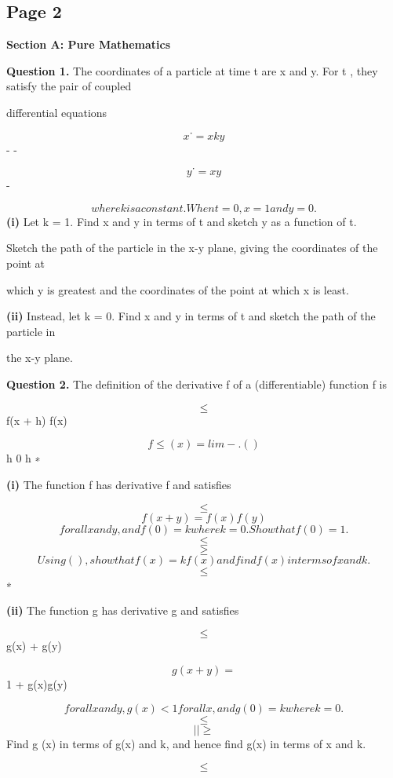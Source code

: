 \documentclass[12pt]{article}
\begin{document}
\subsection*{Page 2}
\begin{flushleft}
\bigskip\textbf{Section A: Pure Mathematics}\par
\bigskip\textbf{Question 1.} The coordinates of a particle at time t are x and y. For t , they satisfy the pair of coupled\par
differential equations\par
\[x˙ = x ky\]
- -\par
\[y˙ = x y\]
-\par
\[where k is a constant. When t = 0, x = 1 and y = 0.\]
\textbf{(i)} Let k = 1. Find x and y in terms of t and sketch y as a function of t.\par
Sketch the path of the particle in the x-y plane, giving the coordinates of the point at\par
which y is greatest and the coordinates of the point at which x is least.\par
\textbf{(ii)} Instead, let k = 0. Find x and y in terms of t and sketch the path of the particle in\par
the x-y plane.\par
\bigskip\textbf{Question 2.} The definition of the derivative f of a (differentiable) function f is\par
\[\leq\]
f(x + h) f(x)\par
\[f \leq (x) = lim - . ( )\]
h 0 h ∗\par
\to\par
\textbf{(i)} The function f has derivative f and satisfies\par
\[\leq\]
\[f(x + y) = f(x)f(y)\]
\[for all x and y, and f (0) = k where k = 0 . Show that f(0) = 1.\]
\[\leq\]
\[\geq\]
\[Using ( ), show that f (x) = kf(x) and find f(x) in terms of x and k.\]
\[\leq\]
∗\par
\textbf{(ii)} The function g has derivative g and satisfies\par
\[\leq\]
g(x) + g(y)\par
\[g(x + y) =\]
1 + g(x)g(y)\par
\[for all x and y, g(x) < 1 for all x, and g (0) = k where k = 0 .\]
\[\leq\]
\[| | \geq\]
Find g (x) in terms of g(x) and k, and hence find g(x) in terms of x and k.\par
\[\leq\]
\end{flushleft}
\end{document}
